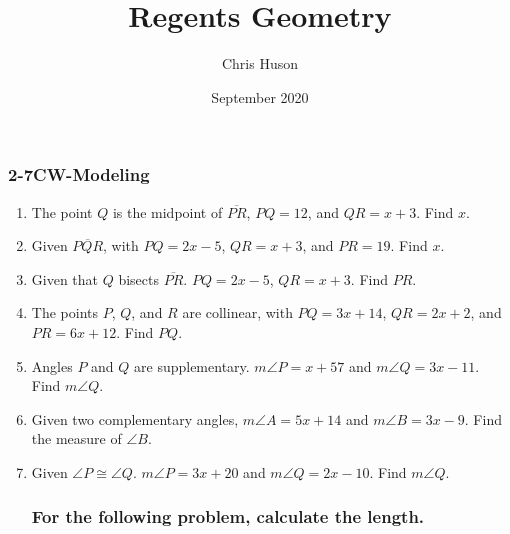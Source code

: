 \documentclass[12pt, twoside]{article}
\title{Regents Geometry}
\author{Chris Huson}
\date{September 2020}
\begin{document}
\subsubsection*{2-7CW-Modeling}
\begin{enumerate}
    \subsubsection*{Do Not Solve! Make a drawing on the right, an equation to the left, and circle where it states what to find.}
    \vspace{0.5cm}

\item The point $Q$ is the midpoint of $\overline{PR}$, $PQ=12$, and $QR=x+3$. Find ${x}$.
\vspace{4cm}

\item Given $\overline{PQR}$, with $PQ=2x-5$, $QR=x+3$, and $PR=19$. Find ${x}$.
\vspace{4cm}

\item Given that $Q$ bisects $\overline{PR}$. $PQ=2x-5$, $QR=x+3$. Find ${PR}$.
\vspace{4cm}

\item The points $P$, $Q$, and $R$ are collinear, with $PQ=3x+14$, $QR=2x+2$, and $PR=6x+12$. Find ${PQ}$.
\vspace{4cm}

\newpage

\item Angles $P$ and $Q$ are supplementary. $m\angle P = x+57$ and $m\angle Q = 3x-11$. Find $m\angle Q$. \vspace{3.5cm} 

\item Given two complementary angles, $m\angle A = 5x+14$ and $m\angle B = 3x-9$. Find the measure of $\angle B$. \vspace{3.5cm} 

\item Given $\angle P \cong \angle Q$. $m\angle P = 3x+20$ and $m\angle Q = 2x-10$. Find $m\angle Q$. \vspace{3.5cm} 

\subsubsection*{For the following problem, calculate the length.}


\end{enumerate}
\end{document}
